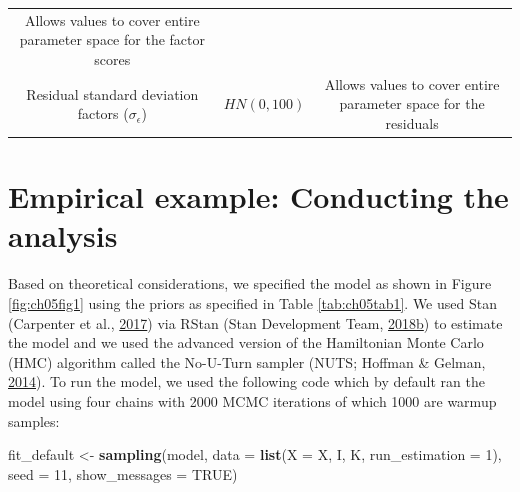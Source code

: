 \documentclass[openright,titlepage,12pt,a4paper]{book}
\newenvironment{Shaded}{\begin{snugshade}}{\end{snugshade}}
\newcommand{\DataTypeTok}[1]{\textcolor[rgb]{0.13,0.29,0.53}{#1}}
\newcommand{\DecValTok}[1]{\textcolor[rgb]{0.00,0.00,0.81}{#1}}
\newcommand{\KeywordTok}[1]{\textcolor[rgb]{0.13,0.29,0.53}{\textbf{#1}}}
\newcommand{\NormalTok}[1]{#1}
\newcommand{\OtherTok}[1]{\textcolor[rgb]{0.56,0.35,0.01}{#1}}
\newcommand{\StringTok}[1]{\textcolor[rgb]{0.31,0.60,0.02}{#1}}
\begin{document}
\begin{longtable}[]{@{}ccc@{}}
\begin{minipage}[t]{0.45\columnwidth}
Allows values to cover entire
parameter space for the factor scores\strut
\end{minipage}\tabularnewline
\begin{minipage}[t]{0.29\columnwidth}\centering
Residual standard
deviation factors
(\(\sigma_\epsilon\))\strut
\end{minipage} & \begin{minipage}[t]{0.16\columnwidth}\centering
\(HN(0, 100)\)\strut
\end{minipage} & \begin{minipage}[t]{0.45\columnwidth}\centering
Allows values to cover entire
parameter space for the residuals\strut
\end{minipage}\tabularnewline
\bottomrule
\end{longtable}

\normalsize

\newpage

\hypertarget{empirical-example-conducting-the-analysis}{%
\section{Empirical example: Conducting the analysis}\label{empirical-example-conducting-the-analysis}}

Based on theoretical considerations, we specified the model as shown in Figure \ref{fig:ch05fig1} using the priors as specified in Table \ref{tab:ch05tab1}. We used Stan (Carpenter et al., \protect\hyperlink{ref-carpenter_stan:_2017}{2017}) via RStan (Stan Development Team, \protect\hyperlink{ref-stan_development_team_rstan:_2018}{2018}\protect\hyperlink{ref-stan_development_team_rstan:_2018}{b}) to estimate the model and we used the advanced version of the Hamiltonian Monte Carlo (HMC) algorithm called the No-U-Turn sampler (NUTS; Hoffman \& Gelman, \protect\hyperlink{ref-hoffman_no-u-turn_2014}{2014}). To run the model, we used the following code which by default ran the model using four chains with 2000 MCMC iterations of which 1000 are warmup samples:

\begin{Shaded}
\begin{Highlighting}[]
\NormalTok{fit_default <-}\StringTok{ }\KeywordTok{sampling}\NormalTok{(model, }\DataTypeTok{data =} \KeywordTok{list}\NormalTok{(}\DataTypeTok{X =}\NormalTok{ X, I, K, }
                                           \DataTypeTok{run_estimation =} \DecValTok{1}\NormalTok{),}
                        \DataTypeTok{seed =} \DecValTok{11}\NormalTok{,  }\DataTypeTok{show_messages =} \OtherTok{TRUE}\NormalTok{) }
\end{Highlighting}
\end{Shaded}
\end{document}
